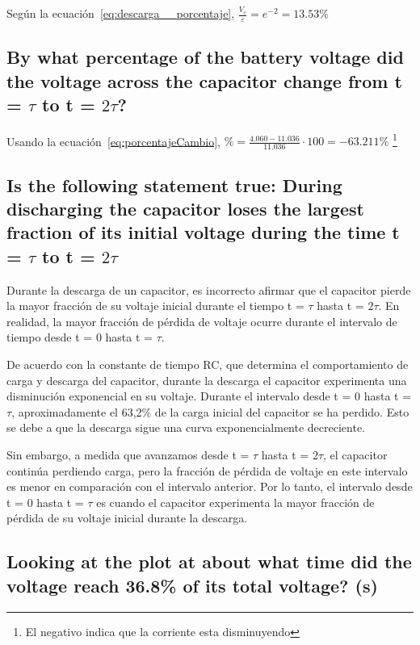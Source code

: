 \documentclass[twocolumn, 12pt]{article}
\begin{document}
Según la ecuación~\eqref{eq:descarga__porcentaje},
$\frac{V_c}{\varepsilon} = e^{-2} = 13.53\%$

\subsection{By what percentage of the battery voltage did the voltage across the capacitor change
    from t = $\tau$ to t = $2\tau$?}

Usando la ecuación~\eqref{eq:porcentajeCambio}, $\% =
    \frac{4.060 - 11.036}{11.036} \cdot 100 = -63.211\%$
\footnote{El negativo indica que la corriente esta
    disminuyendo}

\subsection{Is the following statement true: During discharging the capacitor loses the largest
    fraction of its initial voltage during the time t = $\tau$ to t = $2\tau$}

Durante la descarga de un capacitor, es incorrecto afirmar
que el capacitor pierde la mayor fracción de su voltaje
inicial durante el tiempo t = $\tau$ hasta t = $2\tau$. En
realidad, la mayor fracción de pérdida de voltaje ocurre
durante el intervalo de tiempo desde t = $0$ hasta t =
$\tau$.

De acuerdo con la constante de tiempo RC, que determina el
comportamiento de carga y descarga del capacitor, durante
la descarga el capacitor experimenta una disminución
exponencial en su voltaje. Durante el intervalo desde t = 0
hasta t = $\tau$, aproximadamente el 63,2\% de la carga
inicial del capacitor se ha perdido. Esto se debe a que la
descarga sigue una curva exponencialmente decreciente.

Sin embargo, a medida que avanzamos desde t = $\tau$ hasta
t = $2\tau$, el capacitor continúa perdiendo carga, pero la
fracción de pérdida de voltaje en este intervalo es menor
en comparación con el intervalo anterior. Por lo tanto, el
intervalo desde t = 0 hasta t = $\tau$ es cuando el
capacitor experimenta la mayor fracción de pérdida de su
voltaje inicial durante la descarga.

\subsection{Looking at the plot at about what time did the voltage reach 36.8\% of its total voltage?
    (s)}
\end{document}
